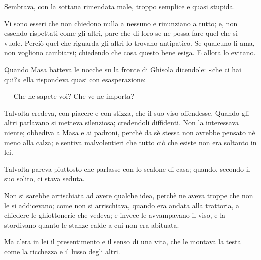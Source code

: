 Sembrava, con la sottana rimendata male, troppo semplice e quasi stupida.

Vi sono esseri che non chiedono nulla a nessuno e rinunziano a tutto; e, non essendo rispettati come gli altri, pare che di loro se ne possa fare quel che si vuole. Perciò quel che riguarda gli altri lo trovano antipatico. Se qualcuno li ama, non vogliono cambiarsi; chiedendo che cosa questo bene esiga. E allora lo evitano.

Quando Masa batteva le nocche su la fronte di Ghìsola dicendole: «che ci hai qui?» ella rispondeva quasi con esasperazione:

— Che ne sapete voi? Che ve ne importa?

Talvolta credeva, con piacere e con stizza, che il suo viso offendesse. Quando gli altri parlavano si metteva silenziosa; credendoli diffidenti. Non la interessava niente; obbediva a Masa e ai padroni, perchè da sè stessa non avrebbe pensato nè meno alla calza; e sentiva malvolentieri che tutto ciò che esiste non era soltanto in lei.

Talvolta pareva piuttosto che parlasse con lo scalone di casa; quando, secondo il suo solito, ci stava seduta.

Non si sarebbe arrischiata ad avere qualche idea, perchè ne aveva troppe che non le si addicevano; come non si arrischiava, quando era andata alla trattoria, a chiedere le ghiottonerie che vedeva; e invece le avvampavano il viso, e la stordivano quanto le stanze calde a cui non era abituata.

Ma c’era in lei il presentimento e il senso di una vita, che le montava la testa come la ricchezza e il lusso degli altri.

